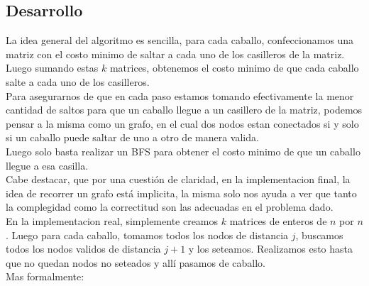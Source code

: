 \subsection{Desarrollo}
La idea general del algoritmo es sencilla, para cada caballo, confeccionamos una matriz con el costo minimo de saltar a cada uno de los casilleros de la matriz. Luego sumando estas $k$ matrices, obtenemos el costo minimo de que cada caballo salte a cada uno de los casilleros.
\\
Para asegurarnos de que en cada paso estamos tomando efectivamente la menor cantidad de saltos para que un caballo llegue a un casillero de la matriz, podemos pensar a la misma como un grafo, en el cual dos nodos estan conectados si y solo si un caballo puede saltar de uno a otro de manera valida.
\\
Luego solo basta realizar un BFS para obtener el costo minimo de que un caballo llegue a esa casilla.
\\
Cabe destacar, que por una cuesti\'on de claridad, en la implementacion final, la idea de recorrer un grafo est\'a implicita, la misma solo nos ayuda a ver que tanto la complegidad como la correctitud son las adecuadas en el problema dado.
\\
En la implementacion real, simplemente creamos $k$ matrices de enteros de $n$ por $n$. Luego para cada caballo, tomamos todos los nodos de distancia $j$, buscamos todos los nodos validos de distancia $j+1$ y los seteamos. Realizamos esto hasta que no quedan nodos no seteados y all\'i pasamos de caballo.
\\
Mas formalmente:
\\
